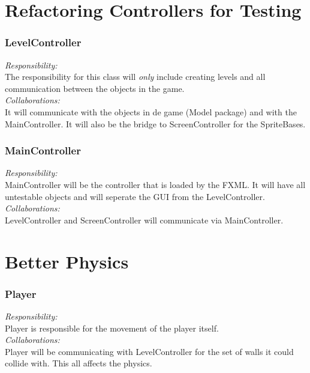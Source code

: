 \section{Refactoring Controllers for Testing}
\subsubsection{LevelController}
\textit{Responsibility:}  \\
The responsibility for this class will \textit{only} include creating levels and all communication between the objects in the game. \\
\textit{Collaborations:} \\
It will communicate with the objects in de game (Model package) and with the MainController. It will also be the bridge to ScreenController for the SpriteBases. \\

\subsubsection{MainController}
\textit{Responsibility:}  \\
MainController will be the controller that is loaded by the FXML. It will have all untestable objects and will seperate the GUI from the LevelController. \\
\textit{Collaborations:} \\
LevelController and ScreenController will communicate via MainController. \\

\section{Better Physics}
\subsubsection{Player}
\textit{Responsibility:}  \\
Player is responsible for the movement of the player itself. \\
\textit{Collaborations:} \\
Player will be communicating with LevelController for the set of walls it could collide with. This all affects the physics. \\
